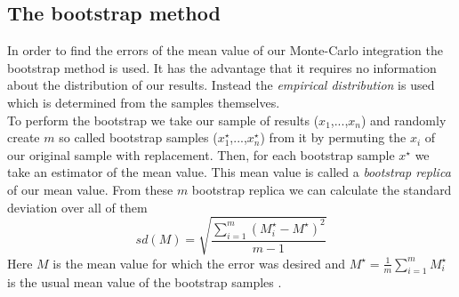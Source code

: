 
\subsection{The bootstrap method}
In order to find the errors of the mean value of our Monte-Carlo integration the bootstrap method is used. It has the advantage that it requires no information about the distribution of our results. Instead the \textit{empirical distribution} is used which is determined from the samples themselves. \\
To perform the bootstrap we take our sample of results ($x_1$,...,$x_n$) and randomly create $m$ so called bootstrap samples ($x^{\star}_1$,...,$x^{\star}_n$) from it by permuting the $x_i$ of our original sample with replacement. Then, for each bootstrap sample $x^{\star}$ we take an estimator of the mean value. This mean value is called a \textit{bootstrap replica} of our mean value. From these $m$ bootstrap replica we can calculate the standard deviation over all of them
\begin{equation}
	sd(M)=\sqrt{\frac{\sum_{i=1}^{m}(M^{\star}_i-M^{\star})^2}{m-1}} \label{bootstraperror}
\end{equation}  
Here $M$ is the mean value for which the error was desired and $M^{\star}=\frac{1}{m}\sum_{i=1}^{m}M^{\star}_i$ is the usual mean value of the bootstrap samples \cite{computational}.
	
